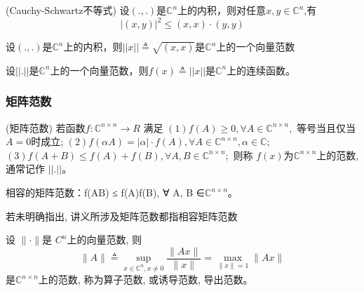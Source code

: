 \documentclass[12pt,a4paper]{article}
\begin{document}
\begin{framed}
	\begin{theorem}(Cauchy-Schwartz不等式)
		设$(.,.)$是$\mathbb{C}^{n}$上的内积，则对任意$x,y \in \mathbb{C}^{n}$,有
		$$
		|(x, y)|^{2} \leq(x, x) \cdot(y, y)
		$$
	\end{theorem}
\end{framed}

\begin{framed}
	\begin{corollary}
		设$(.,.)$是$\mathbb{C}^{n}$上的内积，则$||x||\triangleq \sqrt{(x,x)}$是$\mathbb{C}^{n}$上的一个向量范数
	\end{corollary}
\end{framed}

\begin{framed}
	\begin{theorem}
		设$||.||$是$\mathbb{C}^{n}$上的一个向量范数，则$f(x)\triangleq||x||$是$\mathbb{C}^{n}$上的连续函数。
	\end{theorem}
\end{framed}

\subsubsection{矩阵范数}
\begin{framed}
	\begin{definition}(矩阵范数)
		若函数$f : \mathbb{C}^{n×n} → R$ 满足
		$(1) f(A) ≥ 0, ∀ A ∈ \mathbb{C}^{n×n},$ 等号当且仅当 $A = 0$时成立;
		$(2) f(αA) = |α| · f(A), ∀ A ∈ \mathbb{C}^{n×n}, α ∈ \mathbb{C};$
		$(3) f(A + B) ≤ f(A) + f(B), ∀A, B ∈ \mathbb{C}^{n×n};$
		则称 $f(x) $为$\mathbb{C}
		^{n×n} $上的范数, 通常记作 $||.||$。
	\end{definition}
\end{framed}

相容的矩阵范数：f(AB) ≤ f(A)f(B), ∀ A, B ∈$\mathbb{C}^{n×n}$。

\begin{framed}
	若未明确指出, 讲义所涉及矩阵范数都指相容矩阵范数
\end{framed}

\begin{framed}
	\begin{lemma}
		设 $∥ · ∥ $是 $C^{n}$上的向量范数, 则
		$$
		\|A\| \triangleq \sup _{x \in \mathbb{C}^{n}, x \neq 0} \frac{\|A x\|}{\|x\|}=\max _{\|x\|=1}\|A x\|
		$$
		是$\mathbb{C}
		^{n×n} $上的范数, 称为算子范数, 或诱导范数, 导出范数。
	\end{lemma}
\end{framed}
\end{document}
